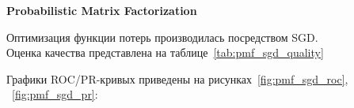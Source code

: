 \pagebreak

\vspace{1em}
\textbf{Probabilistic Matrix Factorization}

Оптимизация функции потерь производилась посредством SGD\@.\\
Оценка качества представлена на таблице~\ref{tab:pmf_sgd_quality}

\begin{table}[h]
    \caption{Значения метрик для PMF}
    \label{tab:pmf_sgd_quality}
\end{table}

Графики ROC/PR-кривых приведены на рисунках~\ref{fig:pmf_sgd_roc}, ~\ref{fig:pmf_sgd_pr}:

